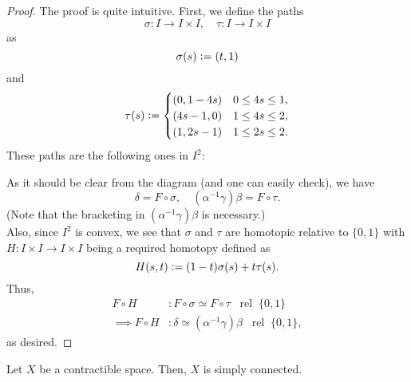 \documentclass[12pt]{article}
\newcommand{\rel}{\;\;\operatorname{rel}\;}
\begin{document}
\begin{proof} 
	The proof is quite intuitive. First, we define the paths
	\begin{equation*} 
		\sigma:I \to I\times I, \quad \tau:I \to I \times I
	\end{equation*}
	as
	\begin{equation*} 
		\sigma(s) \vcentcolon= (t, 1)
	\end{equation*}
	and
	\begin{equation*} 
		\tau(s) \vcentcolon= \begin{cases}
			(0, 1 - 4s) & 0 \le 4s \le 1, \\
			(4s - 1, 0) & 1 \le 4s \le 2, \\
			(1, 2s - 1) & 1 \le 2s \le 2.
		\end{cases}
	\end{equation*}
	These paths are the following ones in $I^2:$
	\begin{center}
	\end{center}
	As it should be clear from the diagram (and one can easily check), we have
	\begin{equation*} 
		\delta = F \circ \sigma, \quad (\alpha^{-1}\gamma)\beta = F \circ \tau.
	\end{equation*}
	(Note that the bracketing in $(\alpha^{-1}\gamma)\beta$ is necessary.)\\
	Also, since $I^2$ is convex, we see that $\sigma$ and $\tau$ are homotopic relative to $\{0, 1\}$ with $H:I\times I \to I\times I$ being a required homotopy defined as
	\begin{equation*} 
		H(s , t) \vcentcolon= (1 - t)\sigma(s) + t\tau(s).
	\end{equation*}
	Thus,
	\begin{align*} 
		F \circ H &: F \circ \sigma \simeq F \circ \tau \rel \{0, 1\}\\
		\implies F \circ H &: \delta \simeq (\alpha^{-1}\gamma)\beta \rel \{0, 1\},
	\end{align*}
	as desired.
\end{proof}	
\begin{thm}
	Let $X$ be a contractible space. Then, $X$ is simply connected.
\end{thm}
\end{document}

